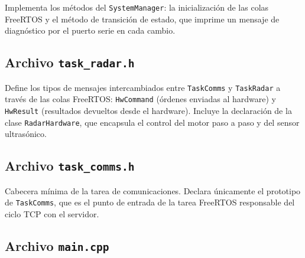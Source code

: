 Implementa los métodos del \texttt{SystemManager}: la inicialización de las colas FreeRTOS
y el método de transición de estado, que imprime un mensaje de diagnóstico por el puerto
serie en cada cambio.



\subsection{Archivo \texttt{task\_radar.h}}

Define los tipos de mensajes intercambiados entre \texttt{TaskComms} y \texttt{TaskRadar}
a través de las colas FreeRTOS: \texttt{HwCommand} (órdenes enviadas al hardware) y
\texttt{HwResult} (resultados devueltos desde el hardware). Incluye la declaración de la
clase \texttt{RadarHardware}, que encapsula el control del motor paso a paso y del sensor
ultrasónico.



\subsection{Archivo \texttt{task\_comms.h}}

Cabecera mínima de la tarea de comunicaciones. Declara únicamente el prototipo de
\texttt{TaskComms}, que es el punto de entrada de la tarea FreeRTOS responsable del
ciclo TCP con el servidor.



\subsection{Archivo \texttt{main.cpp}}

